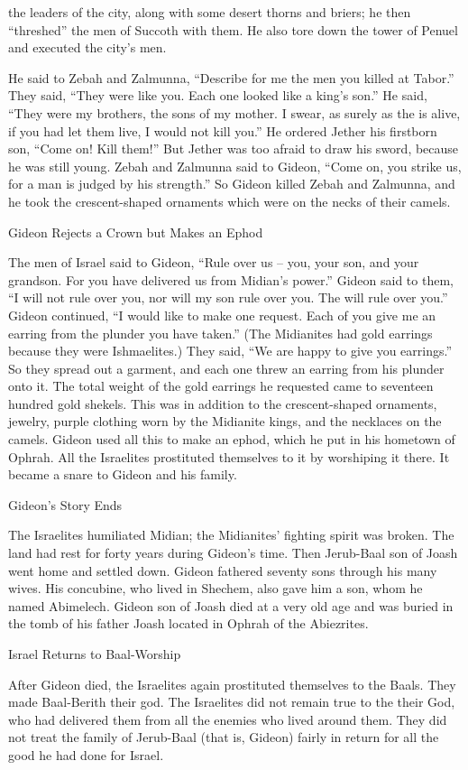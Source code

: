{the leaders
of the city,
along
with some desert
thorns
and briers;
he then “threshed”
the men
of Succoth with them.
He also
tore
down the tower
of Penuel
and executed
the city’s
men.
\par }{\PP {}He said
to
Zebah
and Zalmunna,
“Describe for me
the men
you killed
at Tabor.”
They said,
“They were like
you. Each one
looked like
a king’s
son.”
He said,
“They were
my brothers,
the sons
of my mother.
I swear,
as surely
as the
{}
is alive, if
you had
let them live,
I would
not
kill you.”
He ordered
Jether
his firstborn son,
“Come on! Kill
them!” But
Jether was too afraid
to draw
his sword,
because
he was still
young.
Zebah
and Zalmunna
said
to Gideon, “Come on, you
strike
us, for
a man
is judged by his strength.”
So
Gideon
killed
Zebah
and Zalmunna,
and he took
the
crescent-shaped ornaments
which
were on the necks
of their camels.
\par }{\SH Gideon Rejects a Crown but Makes an Ephod
\par }{\PP {}The men
of Israel
said
to
Gideon,
“Rule over us – you, your son, and your grandson. For you have delivered us from Midian’s power.”
Gideon
said
to
them, “I
will not
rule
over you, nor
will my son
rule
over you. The
{}
will rule over you.”
Gideon
continued, “I would like to make one request.
Each
of you give
me an
earring
from the plunder
you have taken.” (The Midianites had gold
earrings
because
they
were Ishmaelites.)
They said,
“We are happy to give
you
earrings.” So they spread
out a garment,
and each one
threw
an earring
from his plunder onto it.
The total weight
of the gold
earrings
he requested
came to seventeen hundred
gold
shekels. This was in addition to
the crescent-shaped ornaments,
jewelry,
purple
clothing
worn by
the Midianite
kings,
and the necklaces
on the camels.
Gideon
used all this to make
an ephod,
which he put
in his hometown
of Ophrah.
All
the Israelites
prostituted
themselves
to it by worshiping it there.
It became
a snare
to Gideon
and his family.
\par }{\SH Gideon’s Story Ends
\par }{\PP {}The Israelites
humiliated
Midian;
the Midianites’ fighting spirit
was broken.
The land
had rest
for forty
years
during Gideon’s
time.
Then
Jerub-Baal
son
of Joash
went home
and settled down.
Gideon
fathered
seventy
sons
through
his many
wives.
His concubine,
who
lived in Shechem,
also
gave
him
a son,
whom he named
Abimelech.
Gideon
son
of Joash
died
at a very old age
and was buried
in the tomb
of his father
Joash
located in Ophrah
of the Abiezrites.
\par }{\SH Israel Returns to Baal-Worship
\par }{\PP {}After
Gideon
died,
the Israelites
again
prostituted
themselves to the Baals.
They made
Baal-Berith
their god.
The Israelites
did not
remain
true to the
{}
their God,
who had delivered
them from all
the enemies
who lived around them.
They did not
treat
the family
of Jerub-Baal
(that is, Gideon) fairly
in return for all
the good
he had
done
for Israel.

}
